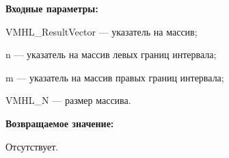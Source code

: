 \textbf{Входные параметры:}
 
VMHL\_ResultVector --- указатель на массив;
 
n --- указатель на массив левых границ интервала;
 
m --- указатель на массив правых границ интервала;
 
VMHL\_N --- размер массива.

\textbf{Возвращаемое значение:}

Отсутствует.